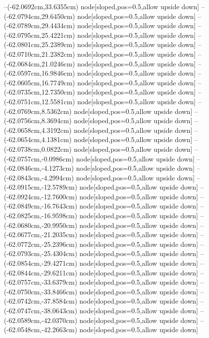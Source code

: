 --(-62.0692cm,33.6355cm) node[sloped,pos=0.5,allow upside down]{\arrowIn}
--(-62.0794cm,29.6450cm) node[sloped,pos=0.5,allow upside down]{\ArrowIn}
--(-62.0789cm,29.4434cm) node[sloped,pos=0.5,allow upside down]{\arrowIn}
--(-62.0795cm,25.4221cm) node[sloped,pos=0.5,allow upside down]{\ArrowIn}
--(-62.0801cm,25.2389cm) node[sloped,pos=0.5,allow upside down]{\arrowIn}
--(-62.0710cm,21.2382cm) node[sloped,pos=0.5,allow upside down]{\ArrowIn}
--(-62.0684cm,21.0246cm) node[sloped,pos=0.5,allow upside down]{\arrowIn}
--(-62.0597cm,16.9846cm) node[sloped,pos=0.5,allow upside down]{\ArrowIn}
--(-62.0605cm,16.7749cm) node[sloped,pos=0.5,allow upside down]{\arrowIn}
--(-62.0735cm,12.7350cm) node[sloped,pos=0.5,allow upside down]{\ArrowIn}
--(-62.0751cm,12.5581cm) node[sloped,pos=0.5,allow upside down]{\arrowIn}
--(-62.0769cm,8.5362cm) node[sloped,pos=0.5,allow upside down]{\ArrowIn}
--(-62.0756cm,8.3694cm) node[sloped,pos=0.5,allow upside down]{\arrowIn}
--(-62.0658cm,4.3192cm) node[sloped,pos=0.5,allow upside down]{\ArrowIn}
--(-62.0654cm,4.1381cm) node[sloped,pos=0.5,allow upside down]{\arrowIn}
--(-62.0738cm,0.0822cm) node[sloped,pos=0.5,allow upside down]{\ArrowIn}
--(-62.0757cm,-0.0986cm) node[sloped,pos=0.5,allow upside down]{\arrowIn}
--(-62.0846cm,-4.1273cm) node[sloped,pos=0.5,allow upside down]{\ArrowIn}
--(-62.0843cm,-4.2994cm) node[sloped,pos=0.5,allow upside down]{\arrowIn}
--(-62.0915cm,-12.5789cm) node[sloped,pos=0.5,allow upside down]{\ArrowIn}
--(-62.0924cm,-12.7600cm) node[sloped,pos=0.5,allow upside down]{\arrowIn}
--(-62.0849cm,-16.7643cm) node[sloped,pos=0.5,allow upside down]{\ArrowIn}
--(-62.0825cm,-16.9598cm) node[sloped,pos=0.5,allow upside down]{\arrowIn}
--(-62.0680cm,-20.9950cm) node[sloped,pos=0.5,allow upside down]{\ArrowIn}
--(-62.0677cm,-21.2035cm) node[sloped,pos=0.5,allow upside down]{\arrowIn}
--(-62.0772cm,-25.2396cm) node[sloped,pos=0.5,allow upside down]{\ArrowIn}
--(-62.0793cm,-25.4304cm) node[sloped,pos=0.5,allow upside down]{\arrowIn}
--(-62.0854cm,-29.4271cm) node[sloped,pos=0.5,allow upside down]{\ArrowIn}
--(-62.0844cm,-29.6211cm) node[sloped,pos=0.5,allow upside down]{\arrowIn}
--(-62.0757cm,-33.6379cm) node[sloped,pos=0.5,allow upside down]{\ArrowIn}
--(-62.0750cm,-33.8466cm) node[sloped,pos=0.5,allow upside down]{\arrowIn}
--(-62.0742cm,-37.8584cm) node[sloped,pos=0.5,allow upside down]{\ArrowIn}
--(-62.0747cm,-38.0643cm) node[sloped,pos=0.5,allow upside down]{\arrowIn}
--(-62.0589cm,-42.0370cm) node[sloped,pos=0.5,allow upside down]{\ArrowIn}
--(-62.0548cm,-42.2663cm) node[sloped,pos=0.5,allow upside down]{\arrowIn}
